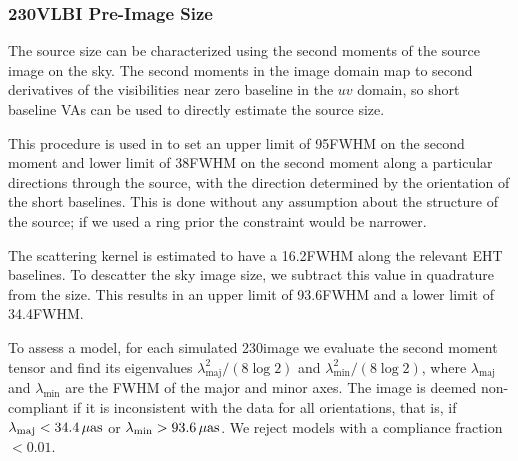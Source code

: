 \subsubsection{230\GHz VLBI Pre-Image Size}
\label{sec:sz}


The source size can be characterized using the second moments of the
source image on the sky.
The second moments in the image domain map to second derivatives of
the visibilities near zero baseline in the $uv$ domain, so short
baseline VAs can be used to directly estimate the source size.

This procedure is used in  to set an upper limit
of 95\uas FWHM on the second moment and lower limit of 38\uas FWHM on
the second moment along a particular directions through the source,
with the direction determined by the orientation of the short
baselines.
This is done without any assumption about the structure of the source;
if we used a ring prior the constraint would be narrower.

The scattering kernel is estimated to have a 16.2\uas FWHM along the
relevant EHT baselines.
To descatter the sky image size, we subtract this value in quadrature
from the size.
This results in an upper limit of 93.6\uas FWHM and a lower limit of
34.4\uas FWHM.

To assess a model, for each simulated 230\GHz image we evaluate the
second moment tensor and find its eigenvalues
$\lambda_\mathrm{maj}^2/(8\log 2)$ and $\lambda_\mathrm{min}^2/(8\log
2)$, where $\lambda_\mathrm{maj}$ and $\lambda_\mathrm{min}$ are the
FWHM of the major and minor axes.
The image is deemed non-compliant if it is inconsistent with the data for
all orientations, that is, if $\lambda_\mathrm{maj} < 34.4\,\mathrm{\mu as}$ or
$\lambda_\mathrm{min} > 93.6\,\mathrm{\mu as}$.
We reject models with a compliance fraction $< 0.01$.

